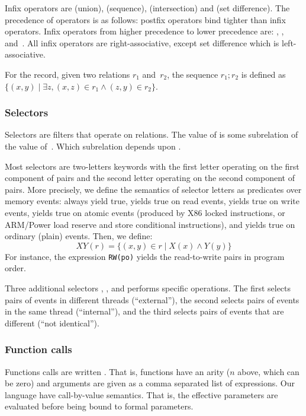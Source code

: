 Infix operators are \T{|} (union), \T{;} (sequence), \T{\&} (intersection)
and \T{\textbackslash} (set difference).
The precedence of operators is as follows:
postfix operators bind tighter than infix operators.
Infix operators from higher precedence to lower precedence are:
\T{\&}, \T{\textbackslash}, \T{;} and~\T{|}.
All infix operators are right-associative,
except set difference which is left-associative.


For the record, given two relations $r_1$ and~$r_2$,
the sequence $r_1; r_2$ is defined
as $\{ (x,y) \mid \exists z, (x,z) \in r_1 \wedge (z,y) \in r_2\}$.

\subsubsection*{Selectors}
Selectors are filters that operate on relations.
The value of  is some subrelation
of the value of~. Which subrelation depends upon
.

Most selectors are two-letters keywords
with the first letter operating on the first component of pairs and
the second letter operating on the second component of pairs.
More precisely, we define the semantics of selector letters as
predicates over memory events:  always yield true,
 yields true on read events,
 yields true on write events,
 yields true on atomic events (produced by X86 locked instructions,
or ARM/Power load reserve and store conditional instructions),
and  yields true on ordinary (plain) events.
Then, we define:
$$
XY(r) = \{ (x,y) \in r \mid X(x) \wedge Y(y)\}
$$
For instance, the expression \verb+RW(po)+ yields the read-to-write pairs
in program order.

Three additional selectors , , and 
performs specific operations.
The first selects pairs of events in different threads (``external''),
the second selects pairs of events in the same thread (``internal''),
and the third selects pairs of events that are different (``not identical'').

\subsubsection*{Function calls}
Functions calls are written
.
That is, functions have an arity ($n$ above, which can be zero)
and arguments are given as a comma separated list of expressions.
Our language have call-by-value semantics. That is,
the effective parameters
 are evaluated before
being bound to formal parameters.

